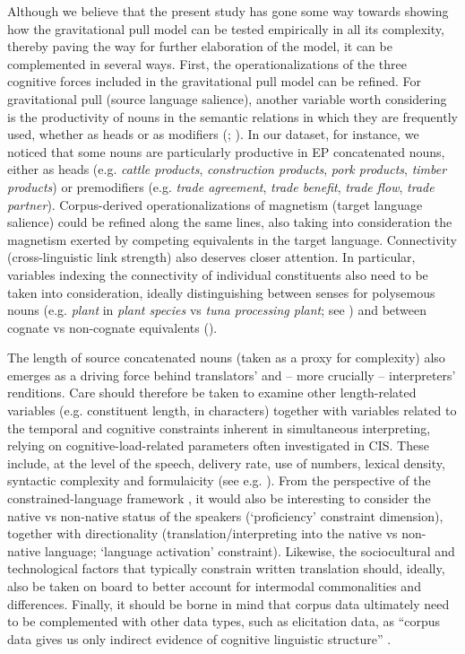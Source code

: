 \documentclass[output=paper]{langscibook}
\begin{document}
Although we believe that the present study has gone some way towards showing how the gravitational pull model can be tested empirically in all its complexity, thereby paving the way for further elaboration of the model, it can be complemented in several ways. First, the operationalizations of the three cognitive forces included in the gravitational pull model can be refined. For gravitational pull (source language salience), another variable worth considering is the productivity of nouns in the semantic relations in which they are frequently used, whether as heads or as modifiers (\citealt[cf.][]{KrottEtAl2009}; \citealt{Fernandez-Dominguez2020}). In our dataset, for instance, we noticed that some nouns are particularly productive in EP concatenated nouns, either as heads (e.g. \textit{cattle products}, \textit{construction products}, \textit{pork products}, \textit{timber products}) or premodifiers (e.g. \textit{trade agreement}, \textit{trade benefit}, \textit{trade flow}, \textit{trade partner}). Corpus-derived operationalizations of magnetism (target language salience) could be refined along the same lines, also taking into consideration the magnetism exerted by competing equivalents in the target language. Connectivity (cross-linguistic link strength) also deserves closer attention. In particular, variables indexing the connectivity of individual constituents also need to be taken into consideration, ideally distinguishing between senses for polysemous nouns (e.g. \textit{plant} in \textit{plant species} vs \textit{tuna processing plant}; see \citealt{SchaeferBell2020}) and between cognate vs non-cognate equivalents (\citealt[cf.][]{ShlesingerMalkiel2005}). 

\largerpage
The length of source concatenated nouns (taken as a proxy for complexity) also emerges as a driving force behind translators’ and – more crucially – interpreters’ renditions. Care should therefore be taken to examine other length-related variables (e.g. constituent length, in characters) together with variables related to the temporal and cognitive constraints inherent in simultaneous interpreting, relying on cognitive-load-related parameters often investigated in CIS. These include, at the level of the speech, delivery rate, use of numbers, lexical density, syntactic complexity and formulaicity (see e.g. \citealt{PlevoetsDefrancq2018cog}). From the perspective of the constrained-language framework \citep{Kotze2020}, it would also be interesting to consider the native vs non-native status of the speakers (‘proficiency’ constraint dimension), together with directionality (translation/interpreting into the native vs non-native language; ‘language activation’ constraint). Likewise, the sociocultural and technological factors that typically constrain written translation should, ideally, also be taken on board to better account for intermodal commonalities and differences. Finally, it should be borne in mind that corpus data ultimately need to be complemented with other data types, such as elicitation data, as “corpus data gives us only indirect evidence of cognitive linguistic structure” \citep[22]{Halverson2017}. 
\end{document}
